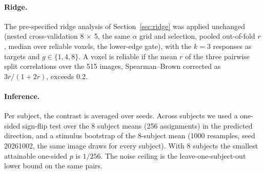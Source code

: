 \paragraph{Ridge.} The pre-specified ridge analysis of Section~\ref{sec:ridge} was applied unchanged
(nested cross-validation 8 $\times$ 5, the same $\alpha$ grid and selection, pooled out-of-fold $r$,
median over reliable voxels, the lower-edge gate), with the $k = 3$ responses as targets and
$g \in \{1, 4, 8\}$. A voxel is reliable if the mean $r$ of the three pairwise split correlations over
the 515 images, Spearman--Brown corrected as $3r/(1+2r)$, exceeds 0.2.

\paragraph{Inference.} Per subject, the contrast is averaged over seeds. Across subjects we used a
one-sided sign-flip test over the 8 subject means (256 assignments) in the predicted direction, and
a stimulus bootstrap of the 8-subject mean (1000 resamples, seed 20261002, the same image draws for
every subject). With 8 subjects the smallest attainable one-sided $p$ is $1/256$. The noise ceiling is
the leave-one-subject-out lower bound on the same pairs.
